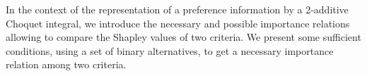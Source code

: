 
In the context of the representation of a preference information by a 2-additive Choquet integral, we introduce  the necessary and possible importance relations allowing to compare the Shapley values of two criteria. We present some sufficient conditions, using a set of binary alternatives, to get a necessary importance relation among two criteria. 


